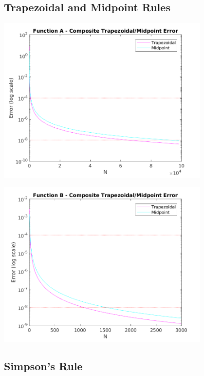 \documentclass[a4paper]{article}
\begin{document}
\subsection{Trapezoidal and Midpoint Rules}\label{results:a}

\begin{center}
	\includegraphics[width=0.8\textwidth]{../output/a_trapezoidal_midpoint.png}
	\label{fig:a_trap_mid}
\end{center}


\begin{center}
	\includegraphics[width=0.8\textwidth]{../output/b_trapezoidal_midpoint.png}
	\label{fig:b_trap_mid}
\end{center}


\subsection{Simpson's Rule}\label{results:sim}
\end{document}
